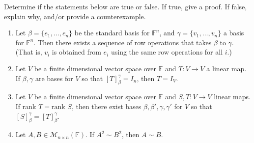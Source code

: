 \documentclass{eh-homework}
\begin{document}
    \begin{question}{13}
        Determine if the statements below are true or false. If true, give a proof. If false, explain why, and/or provide a counterexample.

        \begin{enumerate}[label=(\alph*)]
            \item Let \( \beta = \{ e_1, \ldots, e_n \} \) be the standard basis for \( \mathbb{F}^n \), and \( \gamma = \{ v_1, \ldots, v_n \} \) a basis for \( \mathbb{F}^n \). Then there exists a sequence of row operations that takes \( \beta \) to \( \gamma \). (That is, \( v_i \) is obtained from \( e_i \) using the same row operations for all \( i \).)
            \item Let \( V \) be a finite dimensional vector space over \( \mathbb{F} \) and \( T : V \to V \) a linear map. If \( \beta, \gamma \) are bases for \( V \) so that \( [T]_\beta^\gamma = I_n \), then \( T = I_V \).
            \item Let \( V \) be a finite dimensional vector space over \( \mathbb{F} \) and \( S, T : V \to V \) linear maps. If rank \( T = \text{rank } S \), then there exist bases \( \beta, \beta', \gamma, \gamma' \) for \( V \) so that \( [S]_\beta^\gamma = [T]_\beta^\gamma \).
            \item Let \( A, B \in \mathcal{M}_{n \times n}(\mathbb{F}) \). If \( A^2 \sim B^2 \), then \( A \sim B \).
        \end{enumerate}
    \end{question}
\end{document}
